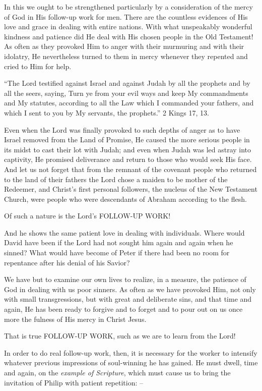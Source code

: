 \documentclass[
]{book}
\begin{document}
In this we ought to be strengthened particularly by a consideration of the mercy of God in His follow-up work for men. There are the countless evidences of His love and grace in dealing with entire nations. With what unspeakably wonderful kindness and patience did He deal with His chosen people in the Old Testament! As often as they provoked Him to anger with their murmuring and with their idolatry, He nevertheless turned to them in mercy whenever they repented and cried to Him for help.

``The Lord testified against Israel and against Judah by all the prophets and by all the seers, saying, Turn ye from your evil ways and keep My commandments and My statutes, according to all the Law which I commanded your fathers, and which I sent to you by My servants, the prophets.'' 2 Kings 17, 13.

Even when the Lord was finally provoked to such depths of anger as to have Israel removed from the Land of Promise, He caused the more serious people in its midst to cast their lot with Judah; and even when Judah was led astray into captivity, He promised deliverance and return to those who would seek His face. And let us not forget that from the remnant of the covenant people who returned to the land of their fathers the Lord chose a maiden to be mother of the Redeemer, and Christ's first personal followers, the nucleus of the New Testament Church, were people who were descendants of Abraham according to the flesh.

Of such a nature is the Lord's FOLLOW-UP WORK!

And he shows the same patient love in dealing with individuals. Where would David have been if the Lord had not sought him again and again when he sinned? What would have become of Peter if there had been no room for repentance after his denial of his Savior?

We have but to examine our own lives to realize, in a measure, the patience of God in dealing with us poor sinners. As often as we have provoked Him, not only with small transgressions, but with great and deliberate sins, and that time and again, He has been ready to forgive and to forget and to pour out on us once more the fulness of His mercy in Christ Jesus.

That is true FOLLOW-UP WORK, such as we are to learn from the Lord!

In order to do real follow-up work, then, it is necessary for the worker to intensify whatever previous impressions of soul-winning he has gained. He must dwell, time and again, on the \emph{example of Scripture}, which must cause us to bring the invitation of Philip with patient repetition: --
\end{document}
